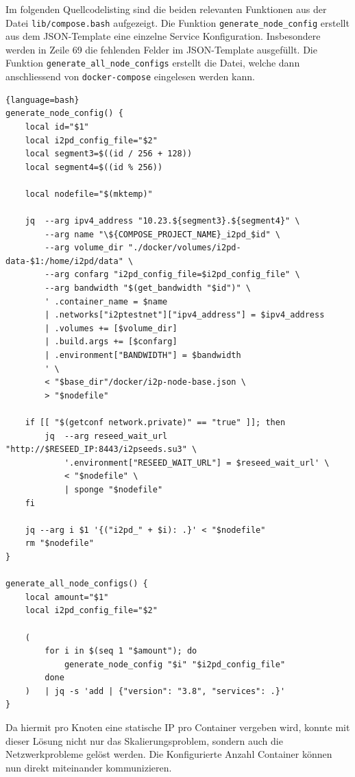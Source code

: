 Im folgenden Quellcodelisting sind die beiden relevanten Funktionen aus der Datei \lstinline|lib/compose.bash| aufgezeigt.
Die Funktion \lstinline|generate_node_config| erstellt aus dem JSON-Template eine einzelne Service Konfiguration.
Insbesondere werden in Zeile 69 die fehlenden Felder im JSON-Template ausgefüllt.
Die Funktion \lstinline|generate_all_node_configs| erstellt die Datei,
welche dann anschliessend von \lstinline|docker-compose| eingelesen werden kann.

\begin{lstlisting}[firstnumber=61]{language=bash}
generate_node_config() {
    local id="$1"
    local i2pd_config_file="$2"
    local segment3=$((id / 256 + 128))
    local segment4=$((id % 256))

    local nodefile="$(mktemp)"

    jq  --arg ipv4_address "10.23.${segment3}.${segment4}" \
        --arg name "\${COMPOSE_PROJECT_NAME}_i2pd_$id" \
        --arg volume_dir "./docker/volumes/i2pd-data-$1:/home/i2pd/data" \
        --arg confarg "i2pd_config_file=$i2pd_config_file" \
        --arg bandwidth "$(get_bandwidth "$id")" \
        ' .container_name = $name
        | .networks["i2ptestnet"]["ipv4_address"] = $ipv4_address
        | .volumes += [$volume_dir]
        | .build.args += [$confarg]
        | .environment["BANDWIDTH"] = $bandwidth
        ' \
        < "$base_dir"/docker/i2p-node-base.json \
        > "$nodefile"

    if [[ "$(getconf network.private)" == "true" ]]; then
        jq  --arg reseed_wait_url "http://$RESEED_IP:8443/i2pseeds.su3" \
            '.environment["RESEED_WAIT_URL"] = $reseed_wait_url' \
            < "$nodefile" \
            | sponge "$nodefile"
    fi

    jq --arg i $1 '{("i2pd_" + $i): .}' < "$nodefile"
    rm "$nodefile"
}

generate_all_node_configs() {
    local amount="$1"
    local i2pd_config_file="$2"

    (
        for i in $(seq 1 "$amount"); do
            generate_node_config "$i" "$i2pd_config_file"
        done
    )   | jq -s 'add | {"version": "3.8", "services": .}'
}
\end{lstlisting}

Da hiermit pro Knoten eine statische IP pro Container vergeben wird,
konnte mit dieser Lösung nicht nur das Skalierungsproblem, sondern auch die Netzwerkprobleme gelöst werden.
Die Konfigurierte Anzahl Container können nun direkt miteinander kommunizieren.

